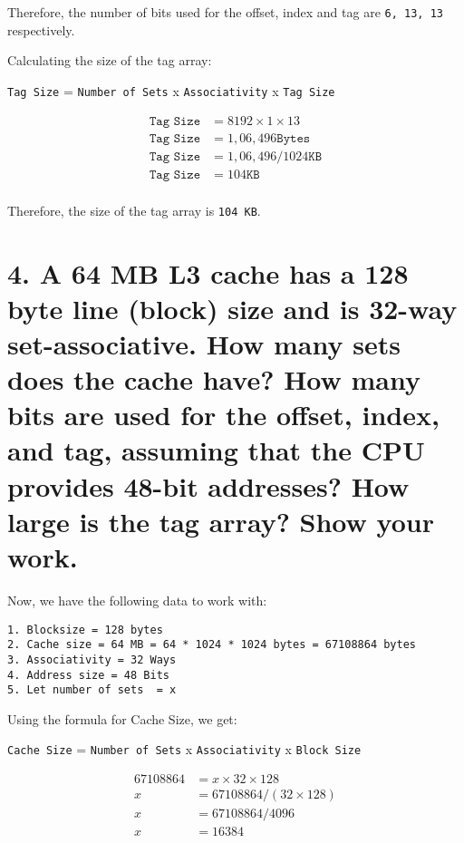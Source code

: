 \documentclass[11pt]{article}
\begin{document}
Therefore, the number of bits used for the offset, index and tag are \texttt{6, 13, 13} respectively.

Calculating the size of the tag array:

\texttt{Tag Size} = \texttt{Number of Sets} x \texttt{Associativity} x \texttt{Tag Size}

\begin{equation}
\begin{split}
\texttt{Tag Size} &= 8192 \times 1 \times 13 \\
\texttt{Tag Size} &= 1,06,496 \texttt{Bytes} \\
\texttt{Tag Size} &= 1,06,496 / 1024 \texttt{KB} \\
\texttt{Tag Size} &= 104 \texttt{KB} \\
\end{split}
\end{equation}

Therefore, the size of the tag array is \texttt{104 KB}.

\newpage

\section*{4. A 64 MB L3 cache has a 128 byte line (block) size and is 32-way set-associative. How many sets does the cache have? How many bits are used for the offset, index, and tag, assuming that the CPU provides 48-bit addresses? How large is the tag array? Show your work.}

Now, we have the following data to work with:
\begin{verbatim}
1. Blocksize = 128 bytes
2. Cache size = 64 MB = 64 * 1024 * 1024 bytes = 67108864 bytes
3. Associativity = 32 Ways
4. Address size = 48 Bits
5. Let number of sets  = x
\end{verbatim}

Using the formula for Cache Size, we get:

\texttt{Cache Size} = \texttt{Number of Sets} x \texttt{Associativity} x \texttt{Block Size}

\begin{equation}
\begin{split}
67108864 &= x \times 32 \times 128 \\
x &= 67108864 / (32 \times 128) \\
x &= 67108864 / 4096 \\
x &= 16384
\end{split}
\end{equation}
\end{document}
